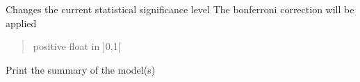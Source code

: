 \documentclass[letterpaper,10pt,english]{sphinxmanual}
\begin{document}
\begin{fulllineitems}
\begin{fulllineitems}
\label{\detokenize{source/chowclassifier:chowclassifier.chow.Chow.set_alpha}}
\pysigstartsignatures
{}
\pysigstopsignatures
\sphinxAtStartPar
Changes the current statistical significance level
The bonferroni correction will be applied
\begin{quote}\begin{description}
\sphinxAtStartPar
positive float in {]}0,1{[}

\end{description}\end{quote}

\end{fulllineitems}


\begin{fulllineitems}
\label{\detokenize{source/chowclassifier:chowclassifier.chow.Chow.set_color}}
\pysigstartsignatures
{}
\pysigstopsignatures
\end{fulllineitems}


\begin{fulllineitems}
\label{\detokenize{source/chowclassifier:chowclassifier.chow.Chow.summary}}
\pysigstartsignatures
{}
\pysigstopsignatures
\sphinxAtStartPar
Print the summary of the model(s)

\end{fulllineitems}


\end{fulllineitems}

\end{document}
